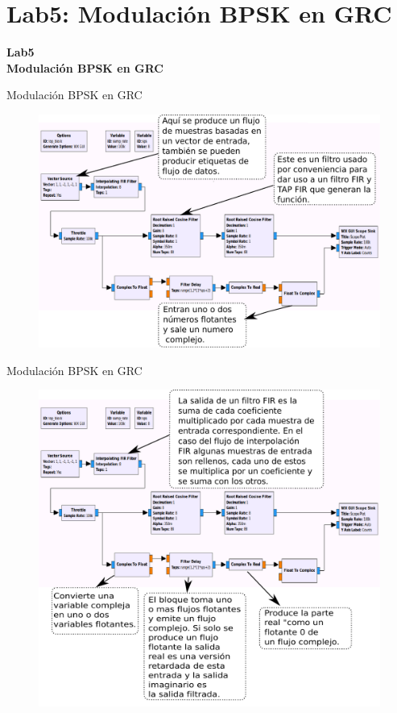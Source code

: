 \section{Lab5: Modulación BPSK en GRC}

\begin{frame}{}


\bfseries{\textrm{\LARGE Lab5\\ \Large Modulación BPSK en GRC}}
\raggedright
\end{frame}

\begin{frame}{Modulación BPSK en GRC}

\begin{figure}
  \centering
   \includegraphics[width=.8\textwidth]{lab5/pdf/lab5_1.pdf}
  \end{figure}
\end{frame}

\begin{frame}{Modulación BPSK en GRC}
\begin{figure}[H]
\centering
\includegraphics[width=.7\textwidth]{lab5/pdf/lab5_2.pdf}
\end{figure}
\end{frame}

